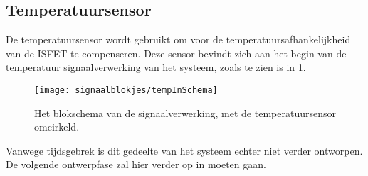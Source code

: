 \subsection{Temperatuursensor}
De temperatuursensor wordt gebruikt om voor de temperatuursafhankelijkheid van de ISFET te compenseren. Deze sensor bevindt zich aan het begin van de temperatuur signaalverwerking van het systeem, zoals te zien is in \cref{fig:tempInSchema}.

\begin{figure}[!htbp]
    \centering
    \texttt{[image: signaalblokjes/tempInSchema]}
    \caption{Het blokschema van de signaalverwerking, met de temperatuursensor omcirkeld.}
    \label{fig:tempInSchema}
\end{figure}

Vanwege tijdsgebrek is dit gedeelte van het systeem echter niet verder ontworpen. De volgende ontwerpfase zal hier verder op in moeten gaan.